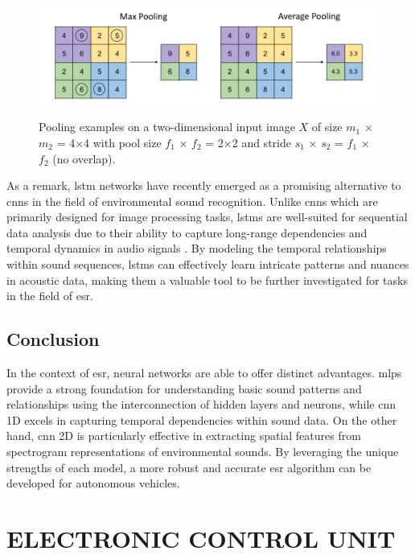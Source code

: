 \begin{figure}[htbp]
    \raggedright
        \caption{Pooling examples on a two-dimensional input image $X$ of size $m_1$ × $m_2$ = 4×4 with pool size $f_1$ × $f_2$ = 2×2 and stride $s_1$ × $s_2$ = $f_1$ × $f_2$ (no overlap).}
        \includegraphics[width=.9\textwidth]{resources/images/030-theoretical_framework/Framework_cnn_pooling.png}
        \label{fig:frmwk_cnn_pooling}
\end{figure}

As a remark, \gls{lstm} networks have recently emerged as a promising alternative to \gls{cnn}s in the field of environmental sound recognition. Unlike \gls{cnn}s which are primarily designed for image processing tasks, \gls{lstm}s are well-suited for sequential data analysis due to their ability to capture long-range dependencies and temporal dynamics in audio signals \cite{Bubashait2021}. By modeling the temporal relationships within sound sequences, \gls{lstm}s can effectively learn intricate patterns and nuances in acoustic data, making them a valuable tool to be further investigated for tasks in the field of \gls{esr}.


\subsection{Conclusion}
\label{sec:frmwk_neural_networks_conclusion}

In the context of \gls{esr}, neural networks are able to offer distinct advantages. \gls{mlp}s provide a strong foundation for understanding basic sound patterns and relationships using the interconnection of hidden layers and neurons, while \gls{cnn} 1D excels in capturing temporal dependencies within sound data. On the other hand, \gls{cnn} 2D is particularly effective in extracting spatial features from spectrogram representations of environmental sounds. By leveraging the unique strengths of each model, a more robust and accurate \gls{esr} algorithm can be developed for autonomous vehicles.


\section{ELECTRONIC CONTROL UNIT}
\label{sec:frmwk_electronic_control_unit}

